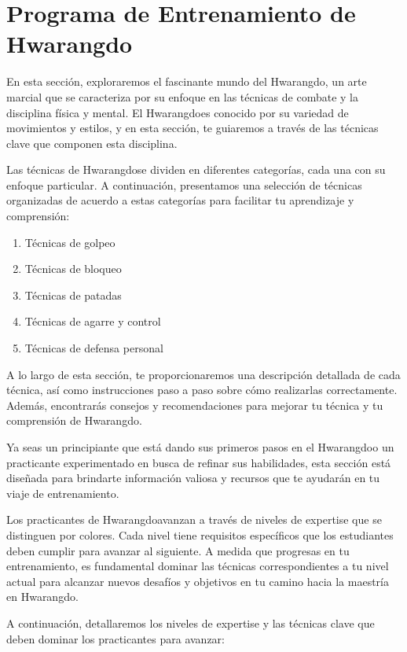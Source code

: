 \chapter{Programa de Entrenamiento de Hwarangdo\textregistered}

En esta sección, exploraremos el fascinante mundo del Hwarangdo\textregistered, un arte marcial que se caracteriza por su enfoque en las técnicas de combate y la disciplina física y mental. El Hwarangdo\textregistered es conocido por su variedad de movimientos y estilos, y en esta sección, te guiaremos a través de las técnicas clave que componen esta disciplina.

Las técnicas de Hwarangdo\textregistered se dividen en diferentes categorías, cada una con su enfoque particular. A continuación, presentamos una selección de técnicas organizadas de acuerdo a estas categorías para facilitar tu aprendizaje y comprensión:

\begin{enumerate}
	\item Técnicas de golpeo
	\item Técnicas de bloqueo
	\item Técnicas de patadas
	\item Técnicas de agarre y control
	\item Técnicas de defensa personal
\end{enumerate}

A lo largo de esta sección, te proporcionaremos una descripción detallada de cada técnica, así como instrucciones paso a paso sobre cómo realizarlas correctamente. Además, encontrarás consejos y recomendaciones para mejorar tu técnica y tu comprensión de Hwarangdo\textregistered.

Ya seas un principiante que está dando sus primeros pasos en el Hwarangdo\textregistered o un practicante experimentado en busca de refinar sus habilidades, esta sección está diseñada para brindarte información valiosa y recursos que te ayudarán en tu viaje de entrenamiento.

Los practicantes de Hwarangdo\textregistered avanzan a través de niveles de expertise que se distinguen por colores. Cada nivel tiene requisitos específicos que los estudiantes deben cumplir para avanzar al siguiente. A medida que progresas en tu entrenamiento, es fundamental dominar las técnicas correspondientes a tu nivel actual para alcanzar nuevos desafíos y objetivos en tu camino hacia la maestría en Hwarangdo\textregistered.

A continuación, detallaremos los niveles de expertise y las técnicas clave que deben dominar los practicantes para avanzar:


